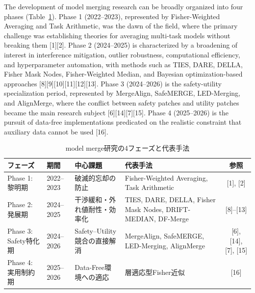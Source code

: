 \documentclass{article}
\begin{document}
The development of model merging research can be broadly organized into four phases (Table~\ref{tab:merge-phases}). Phase 1 (2022--2023), represented by Fisher-Weighted Averaging and Task Arithmetic, was the dawn of the field, where the primary challenge was establishing theories for averaging multi-task models without breaking them [1][2]. Phase 2 (2024--2025) is characterized by a broadening of interest in interference mitigation, outlier robustness, computational efficiency, and hyperparameter automation, with methods such as TIES, DARE, DELLA, Fisher Mask Nodes, Fisher-Weighted Median, and Bayesian optimization-based approaches [8][9][10][11][12][13]. Phase 3 (2024--2026) is the safety-utility specialization period, represented by MergeAlign, SafeMERGE, LED-Merging, and AlignMerge, where the conflict between safety patches and utility patches became the main research subject [6][14][7][15]. Phase 4 (2025--2026) is the pursuit of data-free implementations predicated on the realistic constraint that auxiliary data cannot be used [16].

\begin{table}[htbp]
\centering
\caption{model merge研究の4フェーズと代表手法}
\label{tab:merge-phases}
\small
\begin{tabular}{p{2.3cm}p{1.8cm}p{3.2cm}p{5.2cm}c}
\toprule
フェーズ & 期間 & 中心課題 & 代表手法 & 参照 \\
\midrule
Phase 1: 黎明期 & 2022--2023 & 破滅的忘却の防止 & Fisher-Weighted Averaging, Task Arithmetic & [1], [2] \\

Phase 2: 発展期 & 2024--2025 & 干渉緩和・外れ値耐性・効率化 & TIES, DARE, DELLA, Fisher Mask Nodes, DRIFT-MEDIAN, DF-Merge & [8]--[13] \\

Phase 3: Safety特化期 & 2024--2026 & Safety--Utility競合の直接解消 & MergeAlign, SafeMERGE, LED-Merging, AlignMerge & [6], [14], [7], [15] \\

Phase 4: 実用制約期 & 2025--2026 & Data-Free環境への適応
& 層適応型Fisher近似 & [16] \\
\bottomrule
\end{tabular}
\end{table}
\end{document}
